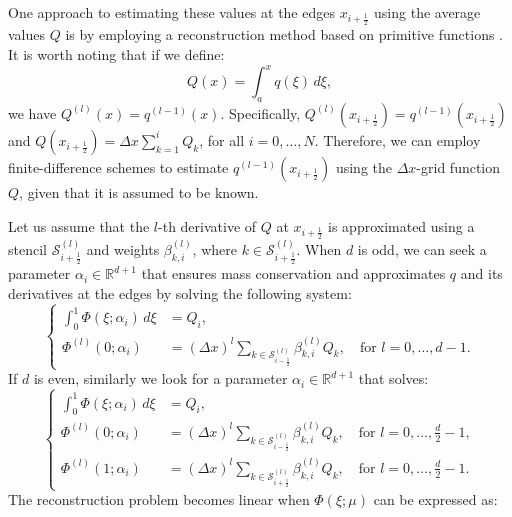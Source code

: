 One approach to estimating these values at the edges $x_{i+\frac{1}{2}}$ using the average 
values $Q$ is by employing a reconstruction method based on primitive functions \citep[Chapter~17]{leveque:2002}. 
It is worth noting that if we define:
\begin{equation}
	\label{chp2-sec-recon-ppm-eq5}
	Q(x) = \int_{a}^x q(\xi) \,d\xi,
\end{equation}
we have $Q^{(l)}(x) = q^{(l-1)}(x)$. 
Specifically, $Q^{(l)}(x_{i+\frac{1}{2}}) = q^{(l-1)}(x_{i+\frac{1}{2}})$ and 
$Q(x_{i+\frac{1}{2}}) = \Delta x\sum_{k=1}^i Q_k$, for all $i=0, \ldots, N$.
Therefore, we can employ finite-difference schemes to estimate $q^{(l-1)}(x_{i+\frac{1}{2}})$
using the $\Delta x$-grid function $Q$, given that it is assumed to be known.

Let us assume that the $l$-th derivative of $Q$ at $x_{i+\frac{1}{2}}$ is approximated using a
stencil $\mathcal{S}^{(l)}_{i+\frac{1}{2}}$ and weights $\beta^{(l)}_{k,i}$, where 
$k \in \mathcal{S}^{(l)}_{i+\frac{1}{2}}$. When $d$ is odd, we can seek a parameter
$\alpha_i \in \mathbb{R}^{d+1}$ that ensures mass conservation and approximates
$q$ and its derivatives at the edges by solving the following system:
\begin{equation}
	\label{chp2-recon-sys1}
	\begin{cases}
		\int_{0}^{1} \Phi(\xi;\alpha_i) \,d\xi &= {Q}_i,\\
		\Phi^{(l)}(0;\alpha_i) &= (\Delta x)^l \sum_{k \in 
		\mathcal{S}^{(l)}_{i-\frac{1}{2}}} \beta_{k,i}^{(l)} {Q}_k, \quad \text{for } l = 0, \ldots, d-1.
	\end{cases}
\end{equation}
If $d$ is even, similarly we look for a parameter $\alpha_i \in \mathbb{R}^{d+1}$ that solves:
\begin{equation}
	\begin{cases}
		\label{chp2-recon-sys2}
		\int_{0}^{1} \Phi(\xi;\alpha_i) \,d\xi &= {Q}_i,\\
		\Phi^{(l)}(0;\alpha_i) &= (\Delta x)^l \sum_{k \in \mathcal{S}^{(l)}_{i-\frac{1}{2}}} \beta_{k,i}^{(l)} {Q}_k, \quad \text{for } l = 0, \ldots, \frac{d}{2}-1,\\
		\Phi^{(l)}(1;\alpha_i) &= (\Delta x)^l \sum_{k \in \mathcal{S}^{(l)}_{i+\frac{1}{2}}} \beta_{k,i}^{(l)} {Q}_k, \quad \text{for } l = 0, \ldots, \frac{d}{2}-1.
	\end{cases}
\end{equation}
The reconstruction problem becomes linear when $\Phi(\xi;\mu)$ can be expressed as:
